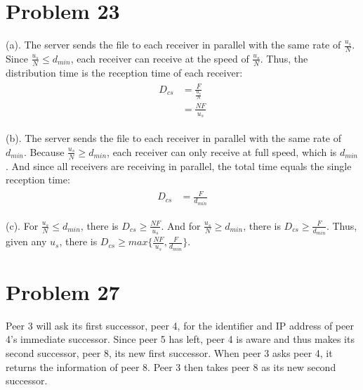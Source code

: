 \documentclass[titlepage, paper=a4, fontsize=11pt]{scrartcl} %
\numberwithin{equation}{section} %
\numberwithin{table}{section} %
\begin{document}

\section*{Problem 23}
(a). The server sends the file to each receiver in parallel with the same rate of $\frac{u_s}{N}$.
Since $\frac{u_s}{N} \leqslant d_{min}$, each receiver can receive at the speed of $\frac{u_s}{N}$.
Thus, the distribution time is the reception time of each receiver:
\begin{align*} 
\begin{split}
D_{cs} &= \frac{F}{\frac{u_s}{N}} \\
&= \frac{NF}{u_s}
\end{split}					
\end{align*}

(b). The server sends the file to each receiver in parallel with the same rate of $d_{min}$.
Because $\frac{u_s}{N} \geqslant d_{min}$, each receiver can only receive at full speed, which is $d_{min}$.
And since all receivers are receiving in parallel, the total time equals the single reception time:
\begin{align*} 
\begin{split}
D_{cs} &= \frac{F}{d_{min}}
\end{split}					
\end{align*}

(c). For $\frac{u_s}{N} \leqslant d_{min}$, there is $D_{cs} \geqslant \frac{NF}{u_s}$.
And for $\frac{u_s}{N} \geqslant d_{min}$, there is $D_{cs} \geqslant \frac{F}{d_{min}}$.
Thus, given any $u_s$, there is $D_{cs} \geqslant max\{ \frac{NF}{u_s}, \frac{F}{d_{min}} \}$.
\\



\section*{Problem 27}
Peer 3 will ask its first successor, peer 4, for the identifier and IP address of peer 4's immediate successor.
Since peer 5 has left, peer 4 is aware and thus makes its second successor, peer 8, its new first successor.
When peer 3 asks peer 4, it returns the information of peer 8. Peer 3 then takes peer 8 as its new second successor.
\\
\end{document}
